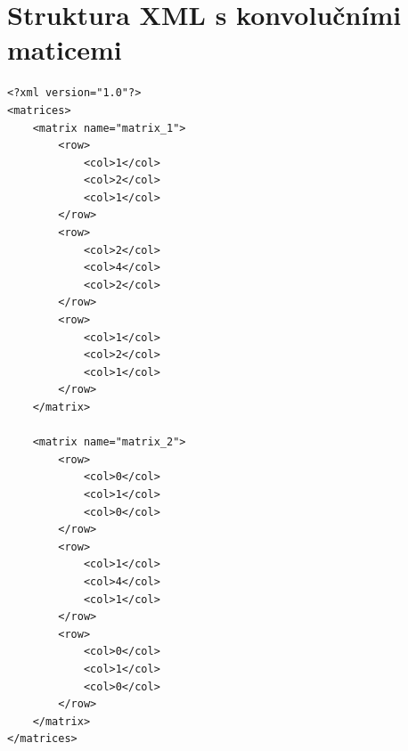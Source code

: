 \documentclass[10pt,a4paper]{article}
\begin{document}
\section{Struktura XML s konvolučními maticemi}
\label{xml}

\begin{verbatim}
<?xml version="1.0"?>
<matrices>
    <matrix name="matrix_1">
        <row>
            <col>1</col>
            <col>2</col>
            <col>1</col>
        </row>
        <row>
            <col>2</col>
            <col>4</col>
            <col>2</col>
        </row>
        <row>
            <col>1</col>
            <col>2</col>
            <col>1</col>
        </row>
    </matrix>

    <matrix name="matrix_2">
        <row>
            <col>0</col>
            <col>1</col>
            <col>0</col>
        </row>
        <row>
            <col>1</col>
            <col>4</col>
            <col>1</col>
        </row>
        <row>
            <col>0</col>
            <col>1</col>
            <col>0</col>
        </row>
    </matrix>
</matrices>

\end{verbatim}
\end{document}
